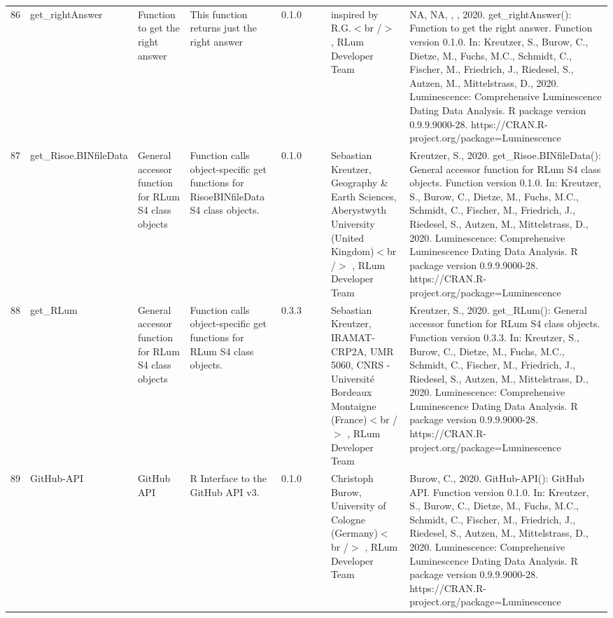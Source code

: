 \begin{table}[ht]
\begin{tabular}{rllllllll}
 \\ 
  86 & get\_rightAnswer & Function to get the right answer & This function returns just the right answer & 0.1.0
 &  &  & inspired by R.G.$<$br /$>$ , RLum Developer Team & NA, NA, , , 2020. get\_rightAnswer(): Function to get the right answer. Function version 0.1.0. In: Kreutzer, S., Burow, C., Dietze, M., Fuchs, M.C., Schmidt, C., Fischer, M., Friedrich, J., Riedesel, S., Autzen, M., Mittelstrass, D., 2020. Luminescence: Comprehensive Luminescence Dating Data Analysis. R package version 0.9.9.9000-28. https://CRAN.R-project.org/package=Luminescence
 \\ 
  87 & get\_Risoe.BINfileData & General accessor function for RLum S4 class objects & Function calls object-specific get functions for RisoeBINfileData S4 class objects. & 0.1.0
 &  &  & Sebastian Kreutzer, Geography \& Earth Sciences, Aberystwyth University (United Kingdom)$<$br /$>$ , RLum Developer Team & Kreutzer, S., 2020. get\_Risoe.BINfileData(): General accessor function for RLum S4 class objects. Function version 0.1.0. In: Kreutzer, S., Burow, C., Dietze, M., Fuchs, M.C., Schmidt, C., Fischer, M., Friedrich, J., Riedesel, S., Autzen, M., Mittelstrass, D., 2020. Luminescence: Comprehensive Luminescence Dating Data Analysis. R package version 0.9.9.9000-28. https://CRAN.R-project.org/package=Luminescence
 \\ 
  88 & get\_RLum & General accessor function for RLum S4 class objects & Function calls object-specific get functions for RLum S4 class objects. & 0.3.3
 &  &  & Sebastian Kreutzer, IRAMAT-CRP2A, UMR 5060, CNRS - Université Bordeaux Montaigne (France)$<$br /$>$ , RLum Developer Team & Kreutzer, S., 2020. get\_RLum(): General accessor function for RLum S4 class objects. Function version 0.3.3. In: Kreutzer, S., Burow, C., Dietze, M., Fuchs, M.C., Schmidt, C., Fischer, M., Friedrich, J., Riedesel, S., Autzen, M., Mittelstrass, D., 2020. Luminescence: Comprehensive Luminescence Dating Data Analysis. R package version 0.9.9.9000-28. https://CRAN.R-project.org/package=Luminescence
 \\ 
  89 & GitHub-API & GitHub API & R Interface to the GitHub API v3. & 0.1.0
 &  &  & Christoph Burow, University of Cologne (Germany)$<$br /$>$ , RLum Developer Team & Burow, C., 2020. GitHub-API(): GitHub API. Function version 0.1.0. In: Kreutzer, S., Burow, C., Dietze, M., Fuchs, M.C., Schmidt, C., Fischer, M., Friedrich, J., Riedesel, S., Autzen, M., Mittelstrass, D., 2020. Luminescence: Comprehensive Luminescence Dating Data Analysis. R package version 0.9.9.9000-28. https://CRAN.R-project.org/package=Luminescence

\end{tabular}
\end{table}
